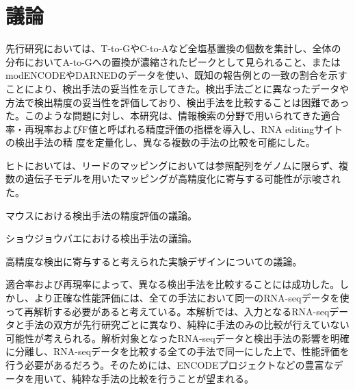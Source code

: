 \section{議論}
先行研究においては、T-to-GやC-to-Aなど全塩基置換の個数を集計し、全体の分布においてA-to-Gへの置換が濃縮されたピークとして見られること、またはmodENCODEやDARNEDのデータを使い、既知の報告例との一致の割合を示すことにより、検出手法の妥当性を示してきた。検出手法ごとに異なったデータや方法で検出精度の妥当性を評価しており、検出手法を比較することは困難であった。このような問題に対し、本研究は、情報検索の分野で用いられてきた適合率・再現率およびF値と呼ばれる精度評価の指標を導入し、RNA editingサイトの検出手法の精
度を定量化し、異なる複数の手法の比較を可能にした。
\par
ヒトにおいては、リードのマッピングにおいては参照配列をゲノムに限らず、複数の遺伝子モデルを用いたマッピングが高精度化に寄与する可能性が示唆された。
\par
マウスにおける検出手法の精度評価の議論。
\par
ショウジョウバエにおける検出手法の議論。
\par
高精度な検出に寄与すると考えられた実験デザインについての議論。
\par
適合率および再現率によって、異なる検出手法を比較することには成功した。しかし、より正確な性能評価には、全ての手法において同一のRNA-seqデータを使って再解析する必要があると考えている。本解析では、入力となるRNA-seqデータと手法の双方が先行研究ごとに異なり、純粋に手法のみの比較が行えていない可能性が考えられる。解析対象となったRNA-seqデータと検出手法の影響を明確に分離し、RNA-seqデータを比較する全ての手法で同一にした上で、性能評価を行う必要があるだろう。そのためには、ENCODEプロジェクトなどの豊富なデータを用いて、純粋な手法の比較を行うことが望まれる。

